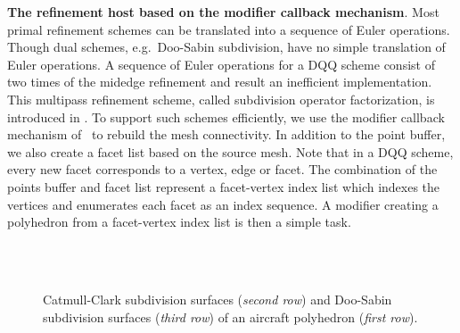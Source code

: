 \noindent\textbf{The refinement host based on the modifier callback mechanism}.
Most primal refinement schemes can be translated into a sequence of
Euler operations. Though dual schemes, e.g.\ Doo-Sabin subdivision,
have no simple translation of Euler operations. A sequence
of Euler operations for a DQQ scheme consist of two times 
of the midedge refinement \cite{Peters:1997:SSS} and 
result an inefficient implementation. This multipass 
refinement scheme, called subdivision operator factorization, 
is introduced in \cite{Peter:2003:CPDSS}.
To support such schemes efficiently, we use the modifier 
callback mechanism of \cgalpoly\ to rebuild the mesh
connectivity. In addition to the point buffer, we
also create a facet list based on the source mesh. Note that in a DQQ
scheme, every new facet corresponds to a vertex, edge or facet. The
combination of the points buffer and facet list represent a
facet-vertex index list which indexes the vertices and enumerates each
facet as an index sequence. A modifier creating a polyhedron from a
facet-vertex index list is then a simple task.

\begin{figure}
  \centering
   \\
  \\
  \caption{Catmull-Clark subdivision surfaces ({\itshape second row}) and
  Doo-Sabin subdivision surfaces ({\itshape third row}) 
  of an aircraft polyhedron ({\itshape first row}).
  }
  \label{fig:SubExample}
\end{figure}

